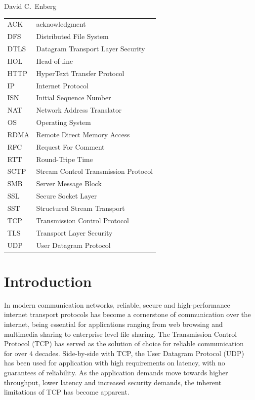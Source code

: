 \documentclass[english, 12pt, a4paper, elec, utf8, a-2b, online]{aaltothesis}
\begin{document}
\vspace{5mm}
{\hfill David C.\ Enberg \hspace{1cm}}

\newpage


\thesistableofcontents



\begin{tabular}{ll}
ACK & acknowledgment \\
DFS & Distributed File System \\
DTLS & Datagram Transport Layer Security \\
HOL & Head-of-line \\
HTTP & HyperText Transfer Protocol \\
IP & Internet Protocol \\
ISN & Initial Sequence Number \\
NAT & Network Address Translator \\
OS & Operating System \\
RDMA & Remote Direct Memory Access \\
RFC & Request For Comment \\
RTT & Round-Tripe Time \\
SCTP & Stream Control Transmission Protocol \\
SMB & Server Message Block \\
SSL & Secure Socket Layer \\
SST & Structured Stream Transport \\
TCP & Transmission Control Protocol \\
TLS & Transport Layer Security \\
UDP & User Datagram Protocol \\
\end{tabular}


\cleardoublepage

\section{Introduction}
\label{sec:intro}

\thispagestyle{empty}

In modern communication networks, reliable, secure and high-performance internet
transport protocols has become a cornerstone of communication over the internet,
being essential for applications ranging from web browsing and multimedia sharing
to enterprise level file sharing. The Transmission Control Protocol (TCP)\cite{rfc793}
has served as the solution of choice for reliable communication for over 4 decades.
Side-by-side with TCP, the User Datagram Protocol (UDP)\cite{rfc768} has been
used for application with high requirements on latency, with no guarantees of
reliability. As the application demands move towards higher throughput, lower latency
and increased security demands, the inherent limitations of TCP has become apparent.
\end{document}
